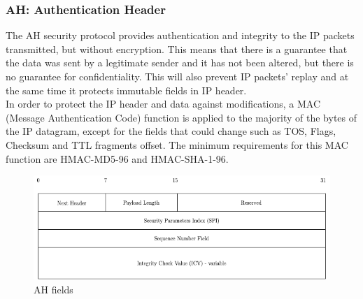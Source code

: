 \documentclass[11pt]{book}
\begin{document}
\subsubsection{AH: Authentication Header}
The AH security protocol provides authentication and integrity to the IP packets transmitted, but without encryption. This means that there is a guarantee that the data was sent by a legitimate sender and it has not been altered, but there is no guarantee for confidentiality. This will also prevent IP packets' replay and at the same time it protects immutable fields in IP header.\\
In order to protect the IP header and data against modifications, a MAC (Message Authentication Code) function is applied to the majority of the bytes of the IP datagram, except for the fields that could change such as TOS, Flags, Checksum and TTL fragments offset. The minimum requirements for this MAC function are HMAC-MD5-96 and HMAC-SHA-1-96.
\begin{figure}[H]
	\centering
	\includegraphics [scale=0.6] {ah_fields.png}
	\caption{AH fields}
\end{figure}
\end{document}
